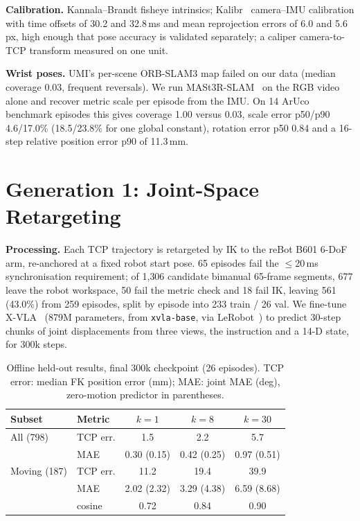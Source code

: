\documentclass[conference,10pt]{IEEEtran}
\newcommand{\mm}{\,mm\xspace}
\begin{document}
\textbf{Calibration.} Kannala--Brandt fisheye intrinsics; Kalibr~\cite{furgale2013kalibr} camera--IMU calibration with time offsets
of 30.2 and 32.8\,ms and mean reprojection errors of 6.0 and 5.6\,px, high enough that pose accuracy is validated separately; a
caliper camera-to-TCP transform measured on one unit.

\textbf{Wrist poses.} UMI's per-scene ORB-SLAM3 map failed on our data (median coverage 0.03, frequent reversals). We run
MASt3R-SLAM~\cite{murai2025mast3rslam} on the RGB video alone and recover metric scale per episode from the IMU. On 14 ArUco
benchmark episodes this gives coverage 1.00 versus 0.03, scale error p50/p90 4.6/17.0\% (18.5/23.8\% for one global constant),
rotation error p50 0.84\textdegree{} and a 16-step relative position error p90 of 11.3\mm.

\section{Generation 1: Joint-Space Retargeting}\label{sec:gen1}
\textbf{Processing.} Each TCP trajectory is retargeted by IK to the reBot B601 6-DoF arm, re-anchored at a fixed robot start pose.
65 episodes fail the $\le$20\,ms synchronisation requirement; of 1{,}306 candidate bimanual 65-frame segments, 677 leave the robot
workspace, 50 fail the metric check and 18 fail IK, leaving 561 (43.0\%) from 259 episodes, split by episode into 233 train / 26
val. We fine-tune X-VLA~\cite{zheng2025xvla} (879M parameters, from \texttt{xvla-base}, via LeRobot~\cite{cadene2024lerobot}) to
predict 30-step chunks of joint displacements from three views, the instruction and a 14-D state, for 300k steps.

\begin{table}[t]
\centering\footnotesize\setlength{\tabcolsep}{5pt}
\caption{Offline held-out results, final 300k checkpoint (26 episodes). TCP error: median FK position error (mm); MAE: joint
MAE (deg), zero-motion predictor in parentheses.}
\label{tab:results}
\begin{tabular}{@{}llccc@{}}
\toprule
Subset & Metric & $k{=}1$ & $k{=}8$ & $k{=}30$ \\
\midrule
All (798) & TCP err. & 1.5 & 2.2 & 5.7 \\
 & MAE & 0.30 (0.15) & 0.42 (0.25) & 0.97 (0.51) \\
\midrule
Moving (187) & TCP err. & 11.2 & 19.4 & 39.9 \\
 & MAE & 2.02 (2.32) & 3.29 (4.38) & 6.59 (8.68) \\
 & cosine & 0.72 & 0.84 & 0.90 \\
\bottomrule
\end{tabular}
\end{table}
\end{document}
